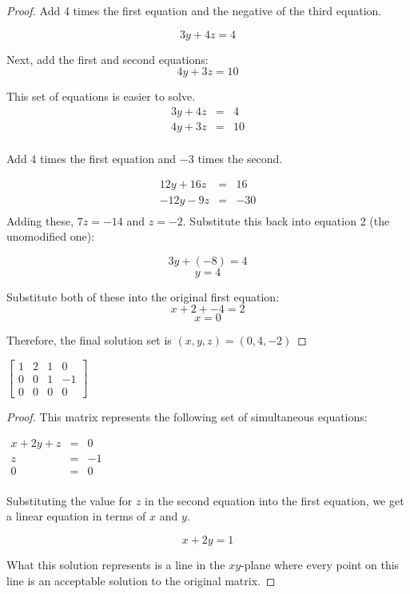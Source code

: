 \documentclass[10pt]{article}
\newenvironment{problem}[2][Problem]{\begin{trivlist}
\item[\hskip \labelsep {\bfseries #1}\hskip \labelsep {\bfseries #2.}]}{\end{trivlist}}
\begin{document}
\begin{proof}
Add 4 times the first equation and the negative of the third equation. 

\[3y+4z = 4\]

Next, add the first and second equations:
\[4y+3z = 10\]

This set of equations is easier to solve. 
	\[
	\begin{array}
	{lcr} 3y+4z & = & 4 \\ 
	4y+3z & = & 10 \\
	\end{array}
	\]

Add 4 times the first equation and $-3$ times the second. 

	\[
	\begin{array}
	{lcr} 12y+16z & = & 16 \\ 
	-12y-9z & = & -30 \\
	\end{array}
	\]
Adding these, $7z=-14$ and $\boxed{z = -2}$. Substitute this back into equation 2 (the unomodified one):

\[3y+(-8) = 4\]
\[\boxed{y = 4}\]

Substitute both of these into the original first equation:
\[x+2+-4 = 2\]
\[\boxed{x = 0}\]

Therefore, the final solution set is $\boxed{(x,y,z) = (0,4,-2)}$

\end{proof}


\begin{problem}{1.2.14}
$\begin{bmatrix}

1 & 2 & 1  &  0 \\
0 & 0 & 1 & -1 \\
0 & 0 & 0 & 0
\end{bmatrix}
$
\end{problem}

\begin{proof}
This matrix represents the following set of simultaneous equations:

	$	
	\begin{array}
	{lcr} 
	x+2y+z& = & 0 \\ 
	z & = & -1 \\
	0 & = & 0 \\
	\end{array}
	$
	
Substituting the value for $z$ in the second equation into the first equation, we get a linear equation in terms of $x$ and $y$. 

\[\boxed{x+2y = 1}\]

What this solution represents is a line in the $xy$-plane where every point on this line is an acceptable solution to the original matrix.  

\end{proof}
\end{document}
